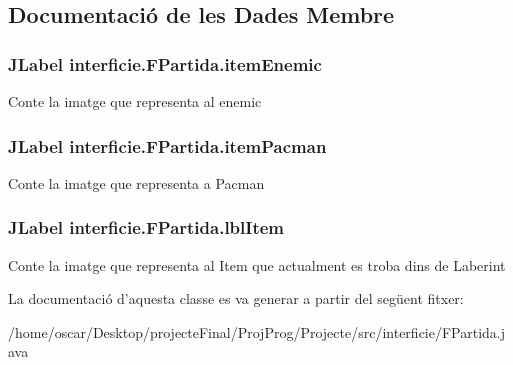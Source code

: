 \subsection{Documentació de les Dades Membre}
\hypertarget{classinterficie_1_1_f_partida_abe23e279e0547f67d0e228cc8bdf4c21}{
\subsubsection[{item\+Enemic}]{\setlength{\rightskip}{0pt plus 5cm}J\+Label interficie.\+F\+Partida.\+item\+Enemic\hspace{0.3cm}{\ttfamily [private]}}}\label{classinterficie_1_1_f_partida_abe23e279e0547f67d0e228cc8bdf4c21}
Conte la imatge que representa al enemic \hypertarget{classinterficie_1_1_f_partida_af864c7289d6462d5c8b4742047f32b57}{
\subsubsection[{item\+Pacman}]{\setlength{\rightskip}{0pt plus 5cm}J\+Label interficie.\+F\+Partida.\+item\+Pacman\hspace{0.3cm}{\ttfamily [private]}}}\label{classinterficie_1_1_f_partida_af864c7289d6462d5c8b4742047f32b57}
Conte la imatge que representa a Pacman \hypertarget{classinterficie_1_1_f_partida_aa4a2e728714a1b1cf9afc70a8b91f808}{
\subsubsection[{lbl\+Item}]{\setlength{\rightskip}{0pt plus 5cm}J\+Label interficie.\+F\+Partida.\+lbl\+Item\hspace{0.3cm}{\ttfamily [private]}}}\label{classinterficie_1_1_f_partida_aa4a2e728714a1b1cf9afc70a8b91f808}
Conte la imatge que representa al Item que actualment es troba dins de Laberint 

La documentació d'aquesta classe es va generar a partir del següent fitxer\+:\begin{DoxyCompactItemize}
\item 
/home/oscar/\+Desktop/projecte\+Final/\+Proj\+Prog/\+Projecte/src/interficie/F\+Partida.\+java\end{DoxyCompactItemize}
